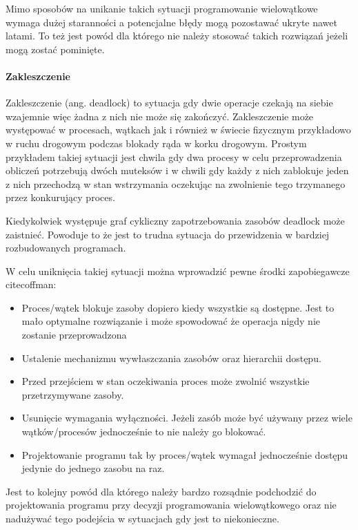\documentclass[a4paper,12pt]{article}
\begin{document}
Mimo sposobów na unikanie takich sytuacji programowanie wielowątkowe wymaga dużej staranności a potencjalne błędy mogą pozostawać ukryte nawet latami. To też jest powód dla którego nie należy stosować takich rozwiązań jeżeli mogą zostać pominięte\cite{multi thread problem}.
\paragraph{Zakleszczenie}

Zakleszczenie (ang. deadlock) to sytuacja gdy dwie operacje czekają na siebie wzajemnie więc żadna z nich nie może się zakończyć. 
Zakleszczenie może występować w procesach, wątkach jak i również w świecie fizycznym przykładowo w ruchu drogowym podczas blokady rąda w korku drogowym.  
Prostym przykładem takiej sytuacji jest chwila gdy dwa procesy w celu przeprowadzenia obliczeń potrzebują dwóch muteksów i w chwili gdy każdy z nich zablokuje jeden z nich przechodzą w stan wstrzymania oczekując na zwolnienie tego trzymanego przez konkurujący proces. 

 Kiedykolwiek występuje graf cykliczny zapotrzebowania zasobów deadlock może zaistnieć. 
 Powoduje to że jest to trudna sytuacja do przewidzenia w bardziej rozbudowanych programach.

W celu uniknięcia takiej sytuacji można wprowadzić pewne środki zapobiegawcze\\cite{coffman}:
\begin{itemize}
        \item Proces/wątek blokuje zasoby dopiero kiedy wszystkie są dostępne. Jest to mało optymalne rozwiązanie i może spowodować że operacja nigdy nie zostanie przeprowadzona
        \item Ustalenie mechanizmu wywłaszczania zasobów oraz hierarchii dostępu. 
        \item Przed przejściem w stan oczekiwania proces może zwolnić wszystkie przetrzymywane zasoby. 
        \item Usunięcie wymagania wyłączności. Jeżeli zasób może być używany przez wiele wątków/procesów jednocześnie to nie należy go blokować.  
        \item Projektowanie programu tak by proces/wątek wymagał jednocześnie dostępu jedynie do jednego zasobu na raz. 
\end{itemize} 

Jest to kolejny powód dla którego należy bardzo rozsądnie podchodzić do projektowania programu przy decyzji programowania wielowątkowego oraz nie nadużywać tego podejścia w sytuacjach gdy jest to niekonieczne. 
\end{document}
